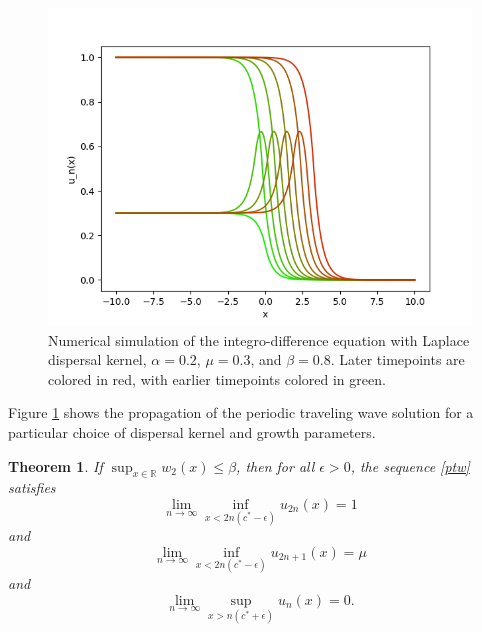 \documentclass[11pt]{article}
\newtheorem{thm}{Theorem}
\theoremstyle{definition}
\numberwithin{equation}{section}
\numberwithin{thm}{section}
\renewcommand{\b}{\beta}
\newcommand{\m}{\mu}
\begin{document}
%

\begin{figure}[h!] 
\centering
  \caption{Numerical simulation of the integro-difference equation with Laplace dispersal kernel, $\alpha=0.2$, $\mu=0.3$, and $\beta=0.8$. Later timepoints are colored in red, with earlier timepoints colored in green.}
\label{fig3}
  \includegraphics[width=.8\linewidth]{figures/fig3.png}
\end{figure}

Figure \ref{fig3} shows the propagation of the periodic traveling wave solution for a particular choice of dispersal kernel and growth parameters.


\begin{thm}  \label{theorem2}
If $\sup_{x\in\mathbb R}w_2(x)\leq \b$, then for all $\epsilon>0$, the sequence \ref{ptw} satisfies
\begin{equation}
\lim_{n\to\infty}\inf_{x<2n(c^*-\epsilon)}u_{2n}(x)=1
\end{equation}
and
\begin{equation}
\lim_{n\to\infty}\inf_{x<2n(c^*-\epsilon)}u_{2n+1}(x)=\m
\end{equation}
and 
\begin{equation}
\lim_{n\to\infty}\sup_{x>n(c^*+\epsilon)}u_n(x)=0.
\end{equation}
\end{thm}
\end{document}
